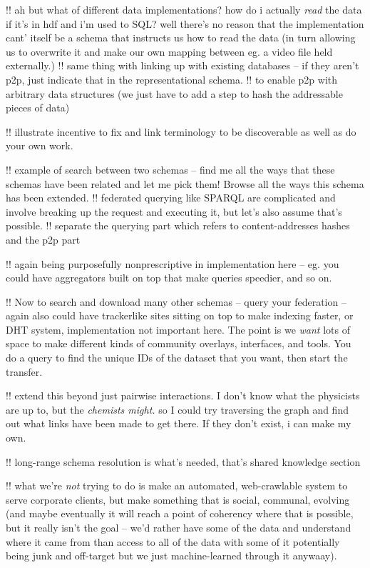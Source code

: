 \documentclass[11pt]{article}
\begin{document}
\begin{multicols}{2}
!! ah but what of different data implementations? how do i actually
\emph{read} the data if it's in hdf and i'm used to SQL? well there's no
reason that the implementation cant' itself be a schema that instructs
us how to read the data (in turn allowing us to overwrite it and make
our own mapping between eg. a video file held externally.) !! same thing
with linking up with existing databases -- if they aren't p2p, just
indicate that in the representational schema. !! to enable p2p with
arbitrary data structures (we just have to add a step to hash the
addressable pieces of data)

!! illustrate incentive to fix and link terminology to be discoverable
as well as do your own work.

!! example of search between two schemas -- find me all the ways that
these schemas have been related and let me pick them! Browse all the
ways this schema has been extended. !! federated querying like SPARQL
are complicated and involve breaking up the request and executing it,
but let's also assume that's possible. !! separate the querying part
which refers to content-addresses hashes and the p2p part

!! again being purposefully nonprescriptive in implementation here --
eg. you could have aggregators built on top that make queries speedier,
and so on.

!! Now to search and download many other schemas -- query your
federation -- again also could have trackerlike sites sitting on top to
make indexing faster, or DHT system, implementation not important here.
The point is we \emph{want} lots of space to make different kinds of
community overlays, interfaces, and tools. You do a query to find the
unique IDs of the dataset that you want, then start the transfer.

!! extend this beyond just pairwise interactions. I don't know what the
physicists are up to, but the \emph{chemists might.} so I could try
traversing the graph and find out what links have been made to get
there. If they don't exist, i can make my own.

!! long-range schema resolution is what's needed, that's shared
knowledge section

!! what we're \emph{not} trying to do is make an automated,
web-crawlable system to serve corporate clients, but make something that
is social, communal, evolving (and maybe eventually it will reach a
point of coherency where that is possible, but it really isn't the goal
-- we'd rather have some of the data and understand where it came from
than access to all of the data with some of it potentially being junk
and off-target but we just machine-learned through it anywaay).


\end{multicols}
\end{document}
